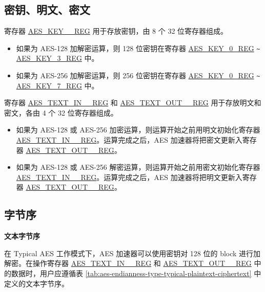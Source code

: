 \documentclass[main\_\_CN.tex]{subfiles}
\begin{document}
\subsection{密钥、明文、密文}

寄存器 \hyperref[regdesc:AESKEYnREG]{AES\_KEY\_\_REG} 用于存放密钥，由 8 个 32 位寄存器组成。

\begin{itemize}
    \item 如果为 AES-128 加解密运算，则 128 位密钥在寄存器 \hyperref[regdesc:AESKEYnREG]{AES\_KEY\_0\_REG} \verb+~+ \hyperref[regdesc:AESKEYnREG]{AES\_KEY\_3\_REG} 中。
    \item 如果为 AES-256 加解密运算，则 256 位密钥在寄存器 \hyperref[regdesc:AESKEYnREG]{AES\_KEY\_0\_REG} \verb+~+ \hyperref[regdesc:AESKEYnREG]{AES\_KEY\_7\_REG} 中。
\end{itemize}

寄存器 \hyperref[regdesc:AESTEXTINnREG]{AES\_TEXT\_IN\_\_REG} 和 \hyperref[regdesc:AESTEXTOUTnREG]{AES\_TEXT\_OUT\_\_REG} 用于存放明文和密文，各由 4 个 32 位寄存器组成。

\begin{itemize}
    \item 如果为 AES-128 或 AES-256 加密运算，则运算开始之前用明文初始化寄存器 \hyperref[regdesc:AESTEXTINnREG]{AES\_TEXT\_IN\_\_REG}。运算完成之后，AES 加速器将把密文更新入寄存器 \hyperref[regdesc:AESTEXTOUTnREG]{AES\_TEXT\_OUT\_\_REG}。
    \item 如果为 AES-128 或 AES-256 解密运算，则运算开始之前用密文初始化寄存器 \hyperref[regdesc:AESTEXTINnREG]{AES\_TEXT\_IN\_\_REG}。运算完成之后，AES 加速器将把明文更新入寄存器 \hyperref[regdesc:AESTEXTOUTnREG]{AES\_TEXT\_OUT\_\_REG}。
\end{itemize}

\subsection{字节序}

\textbf{文本字节序}

在 Typical AES 工作模式下，AES 加速器可以使用密钥对 128 位的 block 进行加解密。在操作寄存器 \hyperref[regdesc:AESTEXTINnREG]{AES\_TEXT\_IN\_\_REG} 和 \hyperref[regdesc:AESTEXTINnREG]{AES\_TEXT\_OUT\_\_REG} 中的数据时，用户应遵循表 \ref{tab:aes-endianness-type-typical-plaintext-ciphertext} 中定义的文本字节序。

\end{document}
